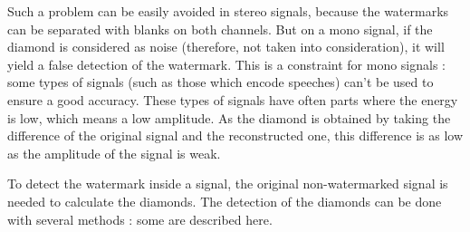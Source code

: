 Such a problem can be easily avoided in stereo signals, because the watermarks can be separated with blanks on both channels. But on a mono signal, if the diamond is considered as noise (therefore, not taken into consideration), it will yield a false detection of the watermark. This is a constraint for mono signals : some types of signals (such as those which encode speeches) can't be used to ensure a good accuracy. These types of signals have often parts where the energy is low, which means a low amplitude. As the diamond is obtained by taking the difference of the original signal and the reconstructed one, this difference is as low as the amplitude of the signal is weak.

To detect the watermark inside a signal, the original non-watermarked signal is needed to calculate the diamonds. The detection of the diamonds can be done with several methods : some are described here.\\
